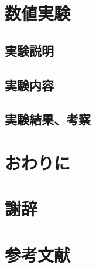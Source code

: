 \documentclass[11pt,a4paper]{jsarticle}
\begin{document}
\section{数値実験}

\subsection{実験説明}

\subsection{実験内容}

\subsection{実験結果、考察}

\section{おわりに}

\section{謝辞}

\section{参考文献}



%
\end{document}

